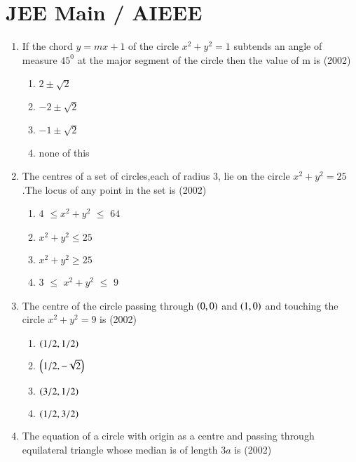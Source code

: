 \documentclass[journal,12pt,twocolumn]{IEEEtran}
\theoremstyle{remark}
\begin{document}
\section{JEE Main / AIEEE}
\begin{enumerate} 
\item If the chord $y=mx+1$ of the circle $x^2+y^2=1$ subtends an angle of measure $45^0$ at the major segment of the circle then the value of m is \hfill{(2002)}\\
\begin{enumerate}
\item$2\pm\sqrt{2}$\\
\item$-2\pm\sqrt{2}$\\
\item$-1\pm\sqrt{2}$\\
\item none of this\\
\end{enumerate}
\item The centres of a set of circles,each of radius $3$, lie on the circle $x^2+y^2=25$.The locus of any point in the set is \hfill{(2002)}\\
\begin{enumerate}
\item$4$ $\leq$$x^2+y^2$ $\leq$ $64$\\
\item$x^2+y^2\leq25$\\
\item$x^2+y^2\geq25$\\
\item$3$ $\leq$ $x^2+y^2$ $\leq$ $9$\\
\end{enumerate}
\item The centre of the circle passing through $\left(0,0\right)$ and $\left(1,0\right)$ and touching the circle $x^2+y^2=9$ is \hfill{(2002)}\\
\begin{enumerate}
\item$\left(1/2,1/2\right)$\\
\item$\left(1/2,-\sqrt{2}\right)$\\
\item$\left(3/2,1/2\right)$\\
\item$\left(1/2,3/2\right)$\\
\end{enumerate}
\item The equation of a circle with origin as a centre and passing through equilateral triangle whose median is of length $3a$ is \hfill{(2002)}\\

\end{enumerate}
\end{document}
